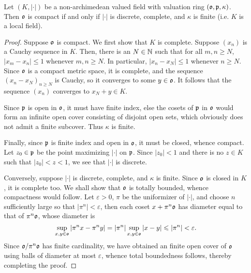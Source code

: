 \begin{theorem}
    Let $(K, |\cdot|)$ be a non-archimedean valued field with valuation ring $(\mathfrak{o}, \mathfrak{p}, \kappa)$. Then $\mathfrak{o}$ is compact if and only if $|\cdot|$ is discrete, complete, and $\kappa$ is finite (i.e. $K$ is a local field).
\end{theorem}
\begin{proof}
    Suppose $\mathfrak{o}$ is compact. We first show that $K$ is complete. Suppose $(x_n)$ is a Cauchy sequence in $K$. Then, there is an $N\in\mathbb{N}$ such that for all $m,n\ge N$, $|x_m - x_n|\le 1$ whenever $m,n\ge N$. In particular, $|x_n - x_N|\le 1$ whenever $n\ge N$. Since $\mathfrak{o}$ is a compact metric space, it is complete, and the sequence $(x_n - x_N)_{n\ge N}$ is Cauchy, so it converges to some $y\in\mathfrak{o}$. It follows that the sequence $(x_n)$ converges to $x_N + y\in K$.

    Since $\mathfrak{p}$ is open in $\mathfrak{o}$, it must have finite index, else the cosets of $\mathfrak{p}$ in $\mathfrak{o}$ would form an infinite open cover consisting of disjoint open sets, which obviously does not admit a finite subcover. Thus $\kappa$ is finite.

    Finally, since $\mathfrak{p}$ is finite index and open in $\mathfrak{o}$, it must be closed, whence compact. Let $z_0\in\mathfrak{p}$ be the point maximizing $|\cdot|$ on $\mathfrak{p}$. Since $|z_0| < 1$ and there is no $z\in K$ such that $|z_0| < z < 1$, we see that $|\cdot|$ is discrete.

    Conversely, suppose $|\cdot|$ is discrete, complete, and $\kappa$ is finite. Since $\mathfrak{o}$ is closed in $K$, it is complete too. We shall show that $\mathfrak{o}$ is totally bounded, whence compactness would follow. Let $\varepsilon > 0$, $\pi$ be the uniformizer of $|\cdot|$, and choose $n$ sufficiently large so that $|\pi^n| < \varepsilon$, then each coset $x + \pi^n\mathfrak{o}$ has diameter equal to that of $\pi^n\mathfrak{o}$, whose diameter is 
    \begin{equation*}
        \sup_{x, y\in\mathfrak{o}}\left|\pi^n x - \pi^n y\right| = |\pi^n|\sup_{x, y\in\mathfrak{o}}|x - y|\leqslant|\pi^n| < \varepsilon.
    \end{equation*}
    Since $\mathfrak{o}/\pi^n\mathfrak{o}$ has finite cardinality, we have obtained an finite open cover of $\mathfrak{o}$ using balls of diameter at most $\varepsilon$, whence total boundedness follows, thereby completing the proof.
\end{proof}

